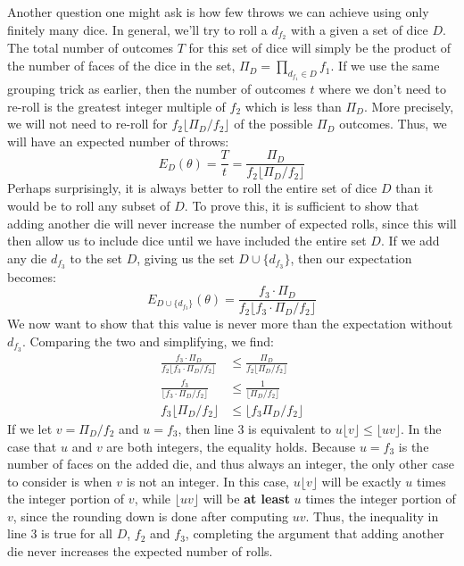 \documentclass{article}
\begin{document}
\par Another question one might ask is how few throws we can achieve using only finitely many dice.
In general, we'll try to roll a $d_{f_2}$ with a given a set of dice $D$. 
The total number of outcomes $T$ for this set of dice will simply be the product of the number of faces of the dice in the set, $\Pi_D=\prod_{d_{f_1}\in{D}}f_1$.
If we use the same grouping trick as earlier, then the number of outcomes $t$ where we don't need to re-roll is the greatest integer multiple of $f_2$ which is less than $\Pi_D$.
More precisely, we will not need to re-roll for $f_2\lfloor \Pi_D/f_2\rfloor$ of the possible $\Pi_D$ outcomes. 
Thus, we will have an expected number of throws: $$E_D(\theta) = \frac{T}{t} = \frac{\Pi_D}{f_2\lfloor \Pi_D/f_2\rfloor}$$
Perhaps surprisingly, it is always better to roll the entire set of dice $D$ than it would be to roll any subset of $D$. 
To prove this, it is sufficient to show that adding another die will never increase the number of expected rolls, since this will then allow us to include dice until we have included the entire set $D$.
If we add any die $d_{f_3}$ to the set $D$, giving us the set $D\cup \{d_{f_3}\}$, then our expectation becomes: $$E_{D\cup\{d_{f_3}\}}(\theta) = \frac{f_3 \cdot \Pi_D}{f_2\lfloor f_3 \cdot \Pi_D/f_2\rfloor}$$
We now want to show that this value is never more than the expectation without $d_{f_3}$. 
Comparing the two and simplifying, we find:
\begin{align}
\frac{f_3 \cdot \Pi_D}{f_2\lfloor f_3 \cdot \Pi_D/f_2\rfloor} & \leq\frac{\Pi_D}{f_2\lfloor \Pi_D/f_2\rfloor}\\
\frac{f_3}{\lfloor f_3 \cdot \Pi_D/f_2\rfloor} &\leq \frac{1}{\lfloor \Pi_D/f_2\rfloor}\\
f_3 \lfloor \Pi_D / f_2 \rfloor &\leq \lfloor f_3 \Pi_D / f_2 \rfloor
\end{align}
If we let $v = \Pi_D / f_2$ and $u = f_3$, then line 3 is equivalent to $u \lfloor v \rfloor \leq \lfloor uv \rfloor$.
In the case that $u$ and $v$ are both integers, the equality holds.
Because $u = f_3$ is the number of faces on the added die, and thus always an integer, the only other case to consider is when $v$ is not an integer.
In this case, $u \lfloor v \rfloor$ will be exactly $u$ times the integer portion of $v$, while $\lfloor uv \rfloor$ will be \textbf{at least} $u$ times the integer portion of $v$, since the rounding down is done after computing $uv$.
Thus, the inequality in line 3 is true for all $D$, $f_2$ and $f_3$, completing the argument that adding another die never increases the expected number of rolls.
\end{document}
